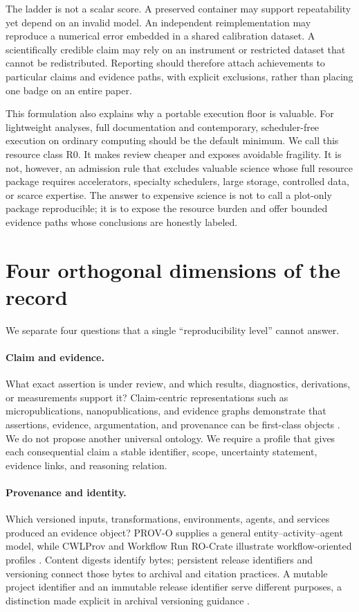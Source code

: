 \documentclass[11pt]{article}
\newcommand{\Rzero}{R0}
\begin{document}
The ladder is not a scalar score. A preserved container may support repeatability yet depend on an invalid model. An independent reimplementation may reproduce a numerical error embedded in a shared calibration dataset. A scientifically credible claim may rely on an instrument or restricted dataset that cannot be redistributed. Reporting should therefore attach achievements to particular claims and evidence paths, with explicit exclusions, rather than placing one badge on an entire paper.

This formulation also explains why a portable execution floor is valuable. For lightweight analyses, full documentation and contemporary, scheduler-free execution on ordinary computing should be the default minimum. We call this resource class \Rzero. It makes review cheaper and exposes avoidable fragility. It is not, however, an admission rule that excludes valuable science whose full resource package requires accelerators, specialty schedulers, large storage, controlled data, or scarce expertise. The answer to expensive science is not to call a plot-only package reproducible; it is to expose the resource burden and offer bounded evidence paths whose conclusions are honestly labeled.

\section{Four orthogonal dimensions of the record}
\label{sec:dimensions}

We separate four questions that a single ``reproducibility level'' cannot answer.

\paragraph{Claim and evidence.} What exact assertion is under review, and which results, diagnostics, derivations, or measurements support it? Claim-centric representations such as micropublications, nanopublications, and evidence graphs demonstrate that assertions, evidence, argumentation, and provenance can be first-class objects \citep{micropublications-2014,nanopublications-2018,evi-2021}. We do not propose another universal ontology. We require a profile that gives each consequential claim a stable identifier, scope, uncertainty statement, evidence links, and reasoning relation.

\paragraph{Provenance and identity.} Which versioned inputs, transformations, environments, agents, and services produced an evidence object? PROV-O supplies a general entity--activity--agent model, while CWLProv and Workflow Run RO-Crate illustrate workflow-oriented profiles \citep{w3c-prov-o-2013,khan-cwlprov-2019,workflow-run-ro-crate-2024}. Content digests identify bytes; persistent release identifiers and versioning connect those bytes to archival and citation practices. A mutable project identifier and an immutable release identifier serve different purposes, a distinction made explicit in archival versioning guidance \citep{zenodo-doi-versioning}.
\end{document}
